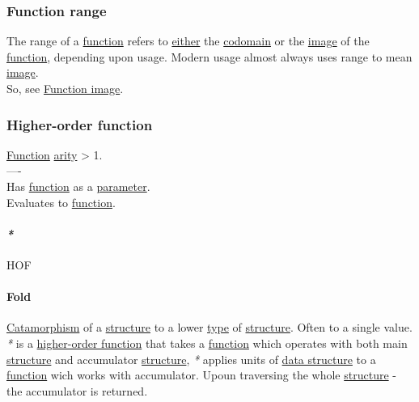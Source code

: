 \documentclass[11pt]{article}
\begin{document}
\subsubsection{\label{org896b949}Function range}
\label{sec:org86674c5}
The range of a \hyperref[orgeb5cddb]{function} refers to \hyperref[orgbc5fdf7]{either} the \hyperref[orgee70232]{codomain} or the \hyperref[orgeb43f0e]{image} of the \hyperref[orgeb5cddb]{function}, depending upon usage. Modern usage almost always uses range to mean \hyperref[orgeb43f0e]{image}.\\
So, see \hyperref[org0c03b7a]{Function image}.\\

\subsubsection{\label{org8b3b842}Higher-order function}
\label{sec:orgf79eec4}
\hyperref[orgeb5cddb]{Function} \hyperref[orgcb1a08f]{arity} > 1.\\

----\\

Has \hyperref[orgeb5cddb]{function} as a \hyperref[org45d4a16]{parameter}.\\
Evaluates to \hyperref[orgeb5cddb]{function}.\\

\paragraph{\emph{*}}
\label{sec:org07b63fc}

\label{org74eb1e1}HOF\\

\paragraph{\label{orgebf2b48}Fold}
\label{sec:orgb970e76}
\hyperref[org9f46ed9]{Catamorphism} of a \hyperref[org93ee82c]{structure} to a lower \hyperref[org4fbaeb8]{type} of \hyperref[org93ee82c]{structure}. Often to a single value.\\

\emph{*} is a \hyperref[org8b3b842]{higher-order function} that takes a \hyperref[orgeb5cddb]{function} which operates with both main \hyperref[org93ee82c]{structure} and accumulator \hyperref[org93ee82c]{structure}, \emph{*} applies units of \hyperref[org47669ca]{data structure} to a \hyperref[orgeb5cddb]{function} wich works with accumulator. Upoun traversing the whole \hyperref[org93ee82c]{structure} - the accumulator is returned.\\
\end{document}
